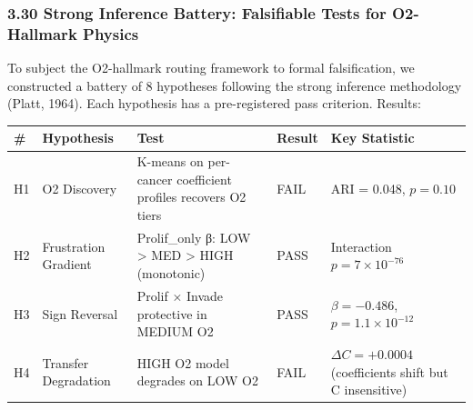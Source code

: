 \documentclass[
  11pt,
]{article}
\newcounter{none} %
\begin{document}
\subsubsection{3.30 Strong Inference Battery: Falsifiable Tests for
O2-Hallmark
Physics}\label{strong-inference-battery-falsifiable-tests-for-o2-hallmark-physics}

To subject the O2-hallmark routing framework to formal falsification, we
constructed a battery of 8 hypotheses following the strong inference
methodology (Platt, 1964). Each hypothesis has a pre-registered pass
criterion. Results:

{\def\LTcaptype{none} %
\begin{longtable}[]{@{}
  >{\raggedright\arraybackslash}p{}
  >{\raggedright\arraybackslash}p{}
  >{\raggedright\arraybackslash}p{}
  >{\raggedright\arraybackslash}p{}
  >{\raggedright\arraybackslash}p{}@{}}
\toprule\noalign{}
\begin{minipage}[b]{\linewidth}\raggedright
\#
\end{minipage} & \begin{minipage}[b]{\linewidth}\raggedright
Hypothesis
\end{minipage} & \begin{minipage}[b]{\linewidth}\raggedright
Test
\end{minipage} & \begin{minipage}[b]{\linewidth}\raggedright
Result
\end{minipage} & \begin{minipage}[b]{\linewidth}\raggedright
Key Statistic
\end{minipage} \\
\midrule\noalign{}
\endhead
\bottomrule\noalign{}
\endlastfoot
H1 & O2 Discovery & K-means on per-cancer coefficient profiles recovers
O2 tiers & FAIL & ARI = 0.048, \(p = 0.10\) \\
H2 & Frustration Gradient & Prolif\_only β: LOW \textgreater{} MED
\textgreater{} HIGH (monotonic) & PASS & Interaction
\(p = 7 \times 10^{-76}\) \\
H3 & Sign Reversal & Prolif × Invade protective in MEDIUM O2 & PASS &
\(\beta = -0.486\), \(p = 1.1 \times 10^{-12}\) \\
H4 & Transfer Degradation & HIGH O2 model degrades on LOW O2 & FAIL &
\(\Delta C = +0.0004\) (coefficients shift but C insensitive) \\

\end{longtable}}
\end{document}
